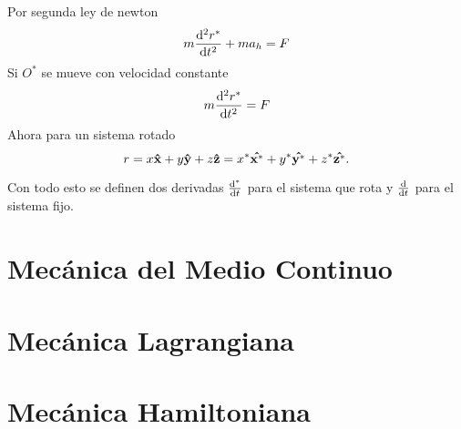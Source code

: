 Por segunda ley de newton
\begin{equation}
	m\dv[2]{r^*}{t} + ma_h = F
\end{equation}
Si $O^*$ se mueve con velocidad constante
	$$ m\dv[2]{r^*}{t} = F $$
Ahora para un sistema rotado
\begin{equation}
	r = x\vu{x} + y\vu{y} + z\vu{z} = x^* \vu{x^*} + y^* \vu{y^*} + z^* \vu{z^*}.
\end{equation}

Con todo esto se definen dos derivadas $\dv{^*}{t}$ para el sistema que rota y $\dv{t}$ para el sistema fijo.










\chapter{Mecánica del Medio Continuo}















\chapter{Mecánica Lagrangiana}
















\chapter{Mecánica Hamiltoniana}



















